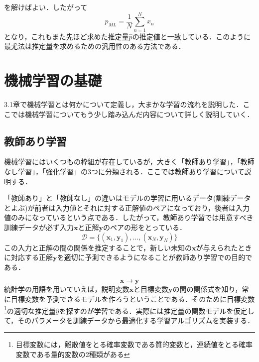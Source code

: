 \documentclass[a4paper,11pt]{jsreport}
\begin{document}
を解けばよい．したがって
\begin{equation}
  p_{ML} = \frac{1}{N} \sum_{n=1}^{N} x_n
\end{equation}
となり，これもまた先ほど求めた推定量$\hat{p}$の推定値と一致している．このように最尤法は推定量を求めるための汎用性のある方法である．

\section{機械学習の基礎}
3.1章で機械学習とは何かについて定義し，大まかな学習の流れを説明した．ここでは機械学習についてもう少し踏み込んだ内容について詳しく説明していく．

\subsection{教師あり学習}
機械学習にはいくつもの枠組が存在しているが，大きく「教師あり学習」，「教師なし学習」，「強化学習」の3つに分類される．ここでは教師あり学習について説明する．\par
「教師あり」と「教師なし」の違いはモデルの学習に用いるデータ(訓練データとよぶ)が前者は入力値とそれに対する正解値のペアになっており，後者は入力値のみになっているという点である．したがって，教師あり学習では用意すべき訓練データが必ず入力$\bm{x}$と正解$\bm{y}$のペアの形をとっている．
\begin{equation}
  \mathcal{D} 
  = \{ (\bm{x}_1, \bm{y}_1), \dots, (\bm{x}_N, \bm{y}_N) \}  
\end{equation}
この入力と正解の間の関係を推定することで，新しい未知の$\bm{x}$が与えられたときに対応する正解$\bm{y}$を適切に予測できるようになることが教師あり学習での目的である．\par
\begin{equation}
  \bm{x} \longrightarrow \bm{y}
\end{equation}
統計学の用語を用いていえば，説明変数$\mathbf{x}$と目標変数$\mathbf{y}$の間の関係式を知り，常に目標変数を予測できるモデルを作ろうということである．そのために目標変数\footnote{目標変数には，離散値をとる確率変数である質的変数と，連続値をとる確率変数である量的変数の2種類がある}の適切な推定量$\hat{y}$を探すのが学習である．実際には推定量の関数モデルを仮定して，そのパラメータを訓練データから最適化する学習アルゴリズムを実装する．
\end{document}
